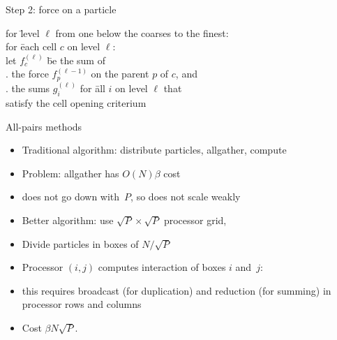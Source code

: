 \begin{frame}{Step 2: force on a particle}
  \begin{tabbing}
    for \=level $\ell$ from one below the coarses to the finest:\\
    \>for \=each cell $c$ on level $\ell$:\\
    \>\>let $f^{(\ell)}_c$ \=be the sum of\\
    \>\>. the force $f^{(\ell-1)}_p$ on the parent $p$ of $c$, and\\
    \>\>. the sums $g^{(\ell)}_i$ for \=all $i$ on level $\ell$ that\\
    \>\>\>\>satisfy the cell opening criterium
  \end{tabbing}
\end{frame}

\begin{frame}{All-pairs methods}
  \begin{itemize}
  \item Traditional algorithm: distribute particles, allgather, compute
  \item Problem: allgather has $O(N)\beta$ cost
  \item does not go down with~$P$, so does not scale weakly
  \end{itemize}
\end{frame}

\begin{frame}
  \begin{itemize}
  \item Better algorithm: use $\sqrt P\times\sqrt P$ processor grid,
  \item Divide particles in boxes of $N/\sqrt P$
  \item Processor $(i,j)$ computes interaction of boxes $i$ and~$j$:
  \item this requires broadcast (for duplication) and reduction (for
    summing) in processor rows and columns
  \item Cost $\beta N\sqrt P$.
  \end{itemize}
\end{frame}
